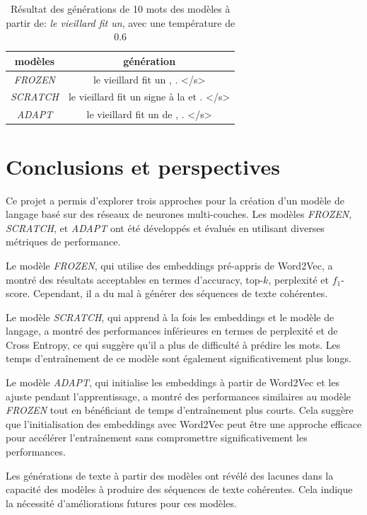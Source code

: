 \documentclass[a4paper]{article}
\begin{document}
\begin{table}[ht]
  \centering
  \begin{tabular}{|c|c|}
      \hline
      modèles & génération \\
      \hline
      \textit{FROZEN} & le vieillard fit un , . </s>  \\
      \textit{SCRATCH} & le vieillard fit un signe à la et . </s>  \\
      \textit{ADAPT} & le vieillard fit un de , . </s>  \\
      \hline
  \end{tabular}
  \caption{Résultat des générations de 10 mots des modèles à partir de: \textit{le vieillard fit un}, avec une température de 0.6}
  \label{tab:generate2}
\end{table}


\section{Conclusions et perspectives}

Ce projet a permis d'explorer trois approches pour la création d'un modèle de langage basé sur des réseaux de neurones multi-couches. Les modèles \textit{FROZEN}, \textit{SCRATCH}, et \textit{ADAPT} ont été développés et évalués en utilisant diverses métriques de performance.

Le modèle \textit{FROZEN}, qui utilise des embeddings pré-appris de Word2Vec, a montré des résultats acceptables en termes d'accuracy, top-$k$, perplexité et $f_1$-score. Cependant, il a du mal à générer des séquences de texte cohérentes.

Le modèle \textit{SCRATCH}, qui apprend à la fois les embeddings et le modèle de langage, a montré des performances inférieures en termes de perplexité et de Cross Entropy, ce qui suggère qu'il a plus de difficulté à prédire les mots. Les temps d'entraînement de ce modèle sont également significativement plus longs.

Le modèle \textit{ADAPT}, qui initialise les embeddings à partir de Word2Vec et les ajuste pendant l'apprentissage, a montré des performances similaires au modèle \textit{FROZEN} tout en bénéficiant de temps d'entraînement plus courts. Cela suggère que l'initialisation des embeddings avec Word2Vec peut être une approche efficace pour accélérer l'entraînement sans compromettre significativement les performances.

Les générations de texte à partir des modèles ont révélé des lacunes dans la capacité des modèles à produire des séquences de texte cohérentes. Cela indique la nécessité d'améliorations futures pour ces modèles.
\end{document}
